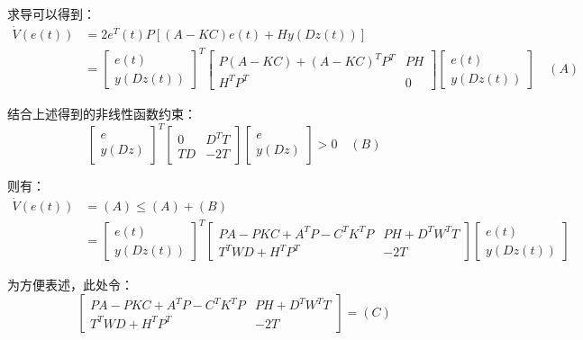 \documentclass[UTF8]{article}
\begin{document}
求导可以得到：
\begin{align*}
	\dot{V}(e(t)) &= 2e^T(t)P[(A - KC)e(t) + Hy(Dz(t))] \\
	&= \begin{bmatrix}
		e(t) \\
		y(Dz(t))
	\end{bmatrix}^T 
	\begin{bmatrix}
		P(A - KC) + (A - KC)^TP^T & PH \\
		H^TP^T & 0
	\end{bmatrix}
	\begin{bmatrix}
		e(t) \\
		y(Dz(t))
	\end{bmatrix} \quad (A)
\end{align*} 

结合上述得到的非线性函数约束：
\begin{equation*}
	\begin{bmatrix}
		e \\
		y(Dz) 
	\end{bmatrix}^T 
	\begin{bmatrix}
		0 & D^T T \\
		TD & -2T
	\end{bmatrix}
	\begin{bmatrix}
		e \\
		y(Dz)
	\end{bmatrix} > 0 \quad (B)
\end{equation*}

则有：
\begin{align*}
	\dot{V}(e(t)) &= (A) \le (A) + (B) \\
	&= \begin{bmatrix}
		e(t) \\
		y(Dz(t))
	\end{bmatrix}^T 
	\begin{bmatrix}
		PA - PKC + A^TP - C^TK^TP & PH + D^TW^TT \\
		T^TWD + H^TP^T & -2T
	\end{bmatrix}
	\begin{bmatrix}
		e(t) \\
		y(Dz(t))
	\end{bmatrix}
\end{align*}

为方便表述，此处令：
\begin{equation*}
	\begin{bmatrix}
		PA - PKC + A^TP - C^TK^TP & PH + D^TW^TT \\
		T^TWD + H^TP^T & -2T
	\end{bmatrix} = (C)
\end{equation*}
\end{document}
